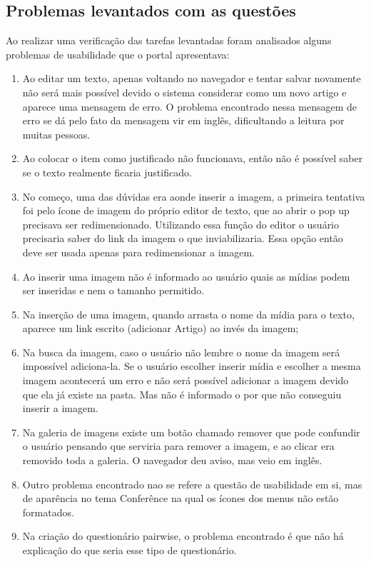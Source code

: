 \subsection{Problemas levantados com as questões}

Ao realizar uma verificação das tarefas levantadas foram analisados alguns problemas de usabilidade que o portal apresentava: 

\begin{enumerate}

\item Ao editar um texto, apenas voltando no navegador e tentar salvar novamente não será mais possível devido o sistema considerar como um novo artigo e aparece uma mensagem de erro. O problema encontrado nessa mensagem de erro se dá pelo fato da mensagem vir em inglês, dificultando a leitura por muitas pessoas. 

\item Ao colocar o item como justificado não funcionava, então não é possível saber se o texto realmente ficaria justificado. 

\item No começo, uma das dúvidas era aonde inserir a imagem, a primeira tentativa foi pelo ícone de imagem do próprio editor de texto, que ao
abrir o pop up precisava ser redimensionado. Utilizando essa função do editor o usuário precisaria saber do link da imagem o que inviabilizaria. Essa opção então deve ser usada apenas para redimensionar a imagem.

\item Ao inserir uma imagem não é informado ao usuário quais as mídias podem ser inseridas e nem o tamanho permitido.

\item Na inserção de uma imagem, quando arrasta o nome da mídia para o texto, aparece um link escrito (adicionar Artigo) ao invés da imagem;

\item Na busca da imagem, caso o usuário não lembre o nome da imagem será impossível adiciona-la. Se o usuário escolher inserir mídia e escolher a mesma imagem acontecerá um erro e não será possível adicionar a imagem devido que ela já existe na pasta. Mas não é informado o por que não conseguiu inserir a imagem.

\item Na galeria de imagens existe um botão chamado remover que pode confundir o usuário pensando que serviria para remover a imagem, e ao clicar era removido toda a galeria. O navegador deu aviso, mas veio em inglês.

\item  Outro problema encontrado nao se refere a questão de usabilidade em si, mas de aparência no tema Conferênce na qual os ícones dos menus não estão formatados.

\item Na criação do questionário pairwise, o problema encontrado é que não há explicação do que seria esse tipo de questionário.

\end{enumerate}
